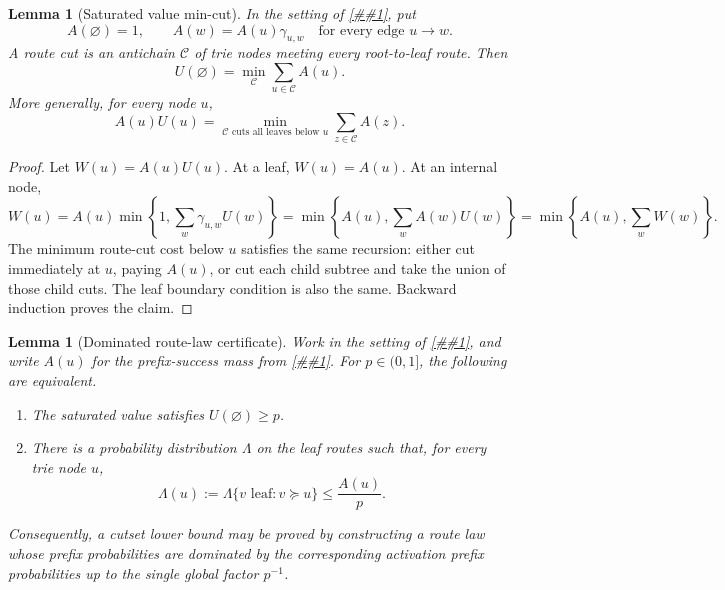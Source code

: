 \documentclass[10pt]{article}
\newcommand{\cref}[1]{\ref{##1}}
\newtheorem{lemma}[theorem]{Lemma}
\theoremstyle{definition}
\begin{document}
\begin{lemma}[Saturated value min-cut]\label{lem:saturated-value-mincut}
   In the setting of \cref{lem:saturated-value-recursion}, put
   \[
      A(\varnothing)=1,
      \qquad
      A(w)=A(u)\gamma_{u,w}
      \quad\text{for every edge }u\to w .
   \]
   A route cut is an antichain $\mathcal C$ of trie nodes meeting every
   root-to-leaf route. Then
   \[
      U(\varnothing)
      =
      \min_{\mathcal C}
      \sum_{u\in\mathcal C}A(u).
   \]
   More generally, for every node $u$,
   \[
      A(u)U(u)
      =
      \min_{\mathcal C\text{ cuts all leaves below }u}
      \sum_{z\in\mathcal C}A(z).
   \]
\end{lemma}

\begin{proof}
   Let $W(u)=A(u)U(u)$. At a leaf, $W(u)=A(u)$. At an internal node,
   \[
      W(u)
      =
      A(u)\min\left\{1,\sum_w\gamma_{u,w}U(w)\right\}
      =
      \min\left\{A(u),\sum_w A(w)U(w)\right\}
      =
      \min\left\{A(u),\sum_w W(w)\right\}.
   \]
   The minimum route-cut cost below $u$ satisfies the same recursion: either
   cut immediately at $u$, paying $A(u)$, or cut each child subtree and take
   the union of those child cuts. The leaf boundary condition is also the same.
   Backward induction proves the claim.
\end{proof}

\begin{lemma}[Dominated route-law certificate]\label{lem:dominated-route-law}
   Work in the setting of \cref{lem:saturated-value-recursion}, and write
   $A(u)$ for the prefix-success mass from
   \cref{lem:saturated-value-mincut}. For $p\in(0,1]$, the following are
   equivalent.
   \begin{enumerate}
      \item The saturated value satisfies $U(\varnothing)\ge p$.
      \item There is a probability distribution $\Lambda$ on the leaf routes
      such that, for every trie node $u$,
      \[
         \Lambda(u):=\Lambda\{v\text{ leaf}:v\succeq u\}
         \le \frac{A(u)}{p}.
      \]
   \end{enumerate}
   Consequently, a cutset lower bound may be proved by constructing a route
   law whose prefix probabilities are dominated by the corresponding
   activation prefix probabilities up to the single global factor $p^{-1}$.
\end{lemma}
\end{document}
